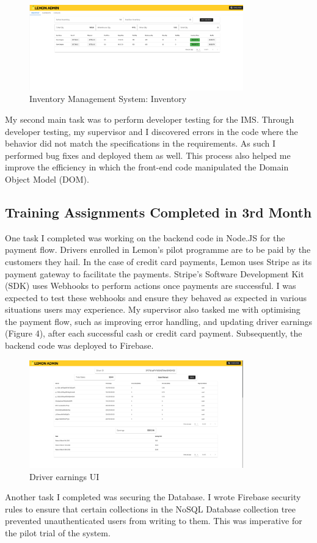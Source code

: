 \begin{figure}[h!]
	\begin{center}
		\includegraphics[width=350px]{assets/images/lemon-inventory.png}
		\caption{Inventory Management System: Inventory}
		\label{fig:lemon-inventory}
	\end{center}
\end{figure}

\noindent
My second main task was to perform developer testing for the IMS. Through developer testing, my supervisor and I discovered errors in the code where the behavior did not match the specifications in the requirements.
As such I performed bug fixes and deployed them as well. This process also helped me improve the efficiency in which the front-end
code manipulated the Domain Object Model (DOM).

\subsection{Training Assignments Completed in 3rd Month}
\noindent
One task I completed was working on the backend code in Node.JS for the payment flow. Drivers enrolled in Lemon's pilot programme are to be paid by the customers they hail. In the case of 
credit card payments, Lemon uses Stripe \cite{REF3:1} as its payment gateway to facilitate the payments. Stripe's Software Development Kit (SDK) uses Webhooks to perform actions
once payments are successful. I was expected to test these webhooks and ensure they behaved as expected in various situations users may experience.
\noindent
My supervisor also tasked me with optimising the payment flow, such as improving error handling, and
updating driver earnings (Figure 4), after each successful cash or credit card payment. Subsequently, the backend code was deployed to Firebase.

\begin{figure}[h!]
	\begin{center}
		\includegraphics[width=350px]{assets/images/lemon-earnings.png}
		\caption{Driver earnings UI}
		\label{fig:lemon-earnings}
	\end{center}
\end{figure}

\noindent
Another task I completed was securing the Database. I wrote Firebase security rules to ensure that certain collections in the NoSQL Database collection tree prevented unauthenticated users from writing to them. This was imperative for the pilot trial of the system.